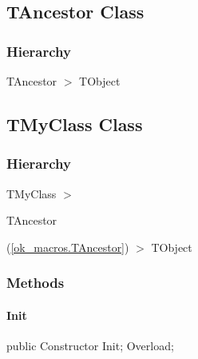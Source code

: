 \documentclass{report}
\newif\ifpdf
\begin{document}
\subsection*{TAncestor Class}
\fi
\label{ok_macros.TAncestor}
\subsubsection*{\large{\textbf{Hierarchy}}\normalsize\hspace{1ex}\hfill}
TAncestor {$>$} TObject
\ifpdf
\subsection*{\large{\textbf{TMyClass Class}}\normalsize\hspace{1ex}\hrulefill}
\else
\subsection*{TMyClass Class}
\fi
\label{ok_macros.TMyClass}
\subsubsection*{\large{\textbf{Hierarchy}}\normalsize\hspace{1ex}\hfill}
TMyClass {$>$} \begin{ttfamily}TAncestor\end{ttfamily}(\ref{ok_macros.TAncestor}) {$>$} 
TObject
\subsubsection*{\large{\textbf{Methods}}\normalsize\hspace{1ex}\hfill}
\paragraph*{Init}\hspace*{\fill}

\label{ok_macros.TMyClass-Init}
\begin{list}{}{
\setlength{\itemindent}{0cm}
\setlength{\listparindent}{0cm}
\setlength{\leftmargin}{\evensidemargin}
\addtolength{\leftmargin}{\tmplength}
\settowidth{\labelsep}{X}
\addtolength{\leftmargin}{\labelsep}
\setlength{\labelwidth}{\tmplength}
}
\item[\textbf{Declaration}\hfill]
\ifpdf
\begin{flushleft}
\fi
\begin{ttfamily}
public Constructor Init; Overload;\end{ttfamily}

\ifpdf
\end{flushleft}
\fi

\end{list}
\end{document}
